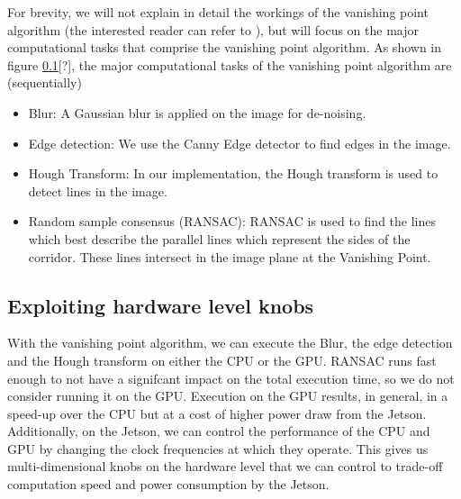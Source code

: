 For brevity, we will not explain in detail the workings of the vanishing point algorithm (the interested reader can refer to \cite{VP1}), but will focus on the major computational tasks that comprise the vanishing point algorithm. As shown in figure \ref{}[?], the major computational tasks of the vanishing point algorithm are (sequentially)

\begin{itemize}
\item Blur: A Gaussian blur is applied on the image for de-noising.
\item Edge detection: We use the Canny Edge detector to find edges in the image.
\item Hough Transform: In our implementation, the Hough transform is used to detect lines in the image.
\item Random sample consensus (RANSAC): RANSAC is used to find the lines which best describe the parallel lines which represent the sides of the corridor. These lines intersect in the image plane at the Vanishing Point.
\end{itemize}

\subsection{Exploiting hardware level knobs}
With the vanishing point algorithm, we can execute the Blur, the edge detection and the Hough transform on either the CPU or the GPU. RANSAC runs fast enough to not have a signifcant impact on the total execution time, so we do not consider running it on the GPU.
Execution on the GPU results, in general, in a speed-up over the CPU but at a cost of higher power draw from the Jetson. Additionally, on the Jetson, we can control the performance of the CPU and GPU by changing the clock frequencies at which they operate. This gives us multi-dimensional knobs on the hardware level that we can control to trade-off computation speed and power consumption by the Jetson.




